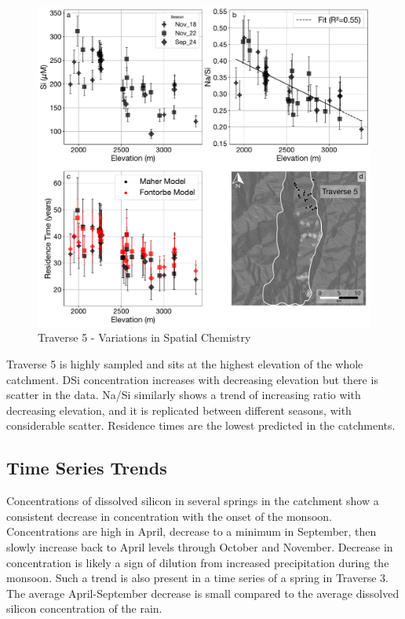 \begin{figure}[h]
    \centering
        \includegraphics[width=\textwidth]{Traverse_5_summary.pdf}
    \caption{Traverse 5 - Variations in Spatial Chemistry}
    \label{fig:spatial_changes_spring5}
\end{figure}

\FloatBarrier

Traverse 5 is highly sampled and sits at the highest elevation of the whole catchment. DSi concentration increases with decreasing elevation but there is scatter in the data. Na/Si similarly shows a trend of increasing ratio with decreasing elevation, and it is replicated between different seasons, with considerable scatter. Residence times are the lowest predicted in the catchments.


\subsection{Time Series Trends}

Concentrations of dissolved silicon in several springs in the catchment show a consistent decrease in concentration with the onset of the monsoon. Concentrations are high in April, decrease to a minimum in September, then slowly increase back to April levels through October and November. Decrease in concentration is likely a sign of dilution from increased precipitation during the monsoon. Such a trend is also present in a time series of a spring in Traverse 3. The average April-September decrease is small compared to the average dissolved silicon concentration of the rain.


